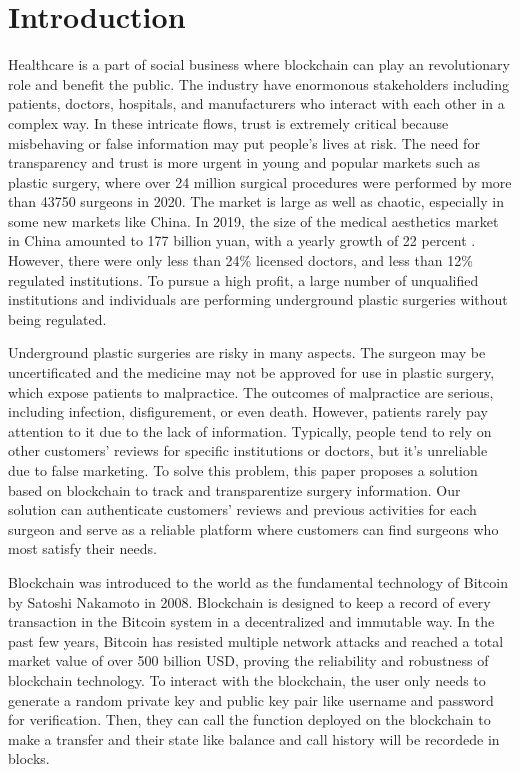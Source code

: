 \documentclass{article}
\begin{document}
\section{Introduction}
Healthcare is a part of social business where blockchain can play an revolutionary role and benefit the public\cite{Business}. The industry have enormonous stakeholders including patients, doctors, hospitals, and manufacturers who interact with each other in a complex way. In these intricate flows, trust is extremely critical because misbehaving or false information may put people's lives at risk. The need for transparency and trust is more urgent in young and popular markets such as plastic surgery, where over 24 million surgical procedures were performed by more than 43750 surgeons in 2020\cite{ISAPS}. The market is large as well as chaotic, especially in some new markets like China. In 2019, the size of the medical aesthetics market in China amounted to 177 billion yuan, with a yearly growth of 22 percent \cite{ChinaMarket}. However, there were only less than 24\% licensed doctors, and less than 12\% regulated institutions\cite{ChinaReport}. To pursue a high profit, a large number of unqualified institutions and individuals are performing underground plastic surgeries without being regulated.
\par Underground plastic surgeries are risky in many aspects. The surgeon may be uncertificated and the medicine may not be approved for use in plastic surgery, which expose patients to malpractice. The outcomes of malpractice are serious, including infection, disfigurement, or even death. However, patients rarely pay attention to it due to the lack of information. Typically, people tend to rely on other customers' reviews for specific institutions or doctors, but it's unreliable due to false marketing. To solve this problem, this paper proposes a solution based on blockchain to track and transparentize surgery information. Our solution can authenticate customers' reviews and  previous activities for each surgeon and serve as a reliable platform where customers can find surgeons who most satisfy their needs.  
\par Blockchain was introduced to the world as the fundamental technology of Bitcoin by Satoshi Nakamoto in 2008\cite{Bitcoin}. Blockchain is designed to keep a record of every transaction in the Bitcoin system in a decentralized and immutable way. In the past few years, Bitcoin has resisted multiple network attacks and reached a total market value of over 500 billion USD, proving the reliability and robustness of blockchain technology. To interact with the blockchain, the user only needs to generate a random private key and public key pair like username and password for verification. Then, they can call the function deployed on the blockchain to make a transfer and their state like balance and call history will be recordede in blocks.
\end{document}
